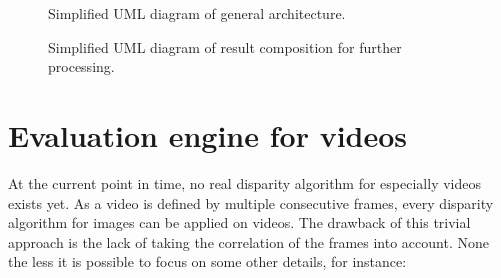 \begin{figure}[h!]
  \centering
  \caption{Simplified UML diagram of general architecture.}
  \label{fig:overview-uml}
\end{figure}

\begin{figure}[h!]
  \centering
  \caption{Simplified UML diagram of result composition for further processing.}
\end{figure}


\section{Evaluation engine for videos}

At the current point in time, no real disparity algorithm for especially videos exists yet.
As a video is defined by multiple consecutive frames, every disparity algorithm for images can be applied on videos.
The drawback of this trivial approach is the lack of taking the correlation of the frames into account.
None the less it is possible to focus on some other details, for instance:

